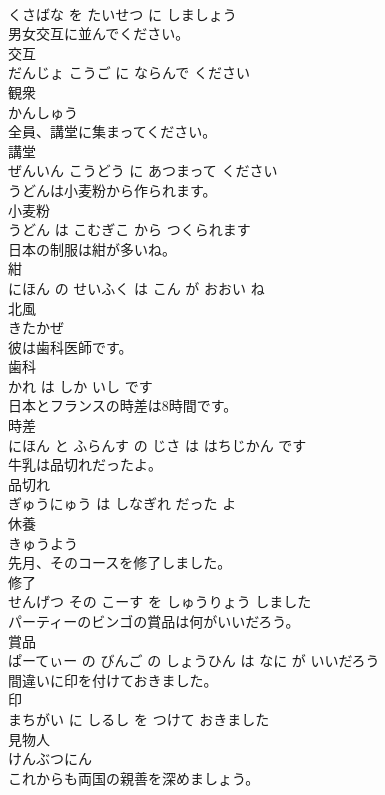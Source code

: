 \documentclass[8pt]{extreport}
\begin{document}
\begin{CJK}{UTF8}{min}
\\	くさばな を たいせつ に しましょう			
\\	男女交互に並んでください。	
\\	交互 
\\	だんじょ こうご に ならんで ください			
\\	観衆	
\\	かんしゅう			
\\	全員、講堂に集まってください。	
\\	講堂 
\\	ぜんいん こうどう に あつまって ください			
\\	うどんは小麦粉から作られます。	
\\	小麦粉 
\\	うどん は こむぎこ から つくられます			
\\	日本の制服は紺が多いね。	
\\	紺 
\\	にほん の せいふく は こん が おおい ね			
\\	北風	
\\	きたかぜ			
\\	彼は歯科医師です。	
\\	歯科 
\\	かれ は しか いし です			
\\	日本とフランスの時差は8時間です。	
\\	時差 
\\	にほん と ふらんす の じさ は はちじかん です			
\\	牛乳は品切れだったよ。	
\\	品切れ 
\\	ぎゅうにゅう は しなぎれ だった よ			
\\	休養	
\\	きゅうよう			
\\	先月、そのコースを修了しました。	
\\	修了 
\\	せんげつ その こーす を しゅうりょう しました			
\\	パーティーのビンゴの賞品は何がいいだろう。	
\\	賞品 
\\	ぱーてぃー の びんご の しょうひん は なに が いいだろう			
\\	間違いに印を付けておきました。	
\\	印 
\\	まちがい に しるし を つけて おきました			
\\	見物人	
\\	けんぶつにん			
\\	これからも両国の親善を深めましょう。	

\end{CJK}
\end{document}
